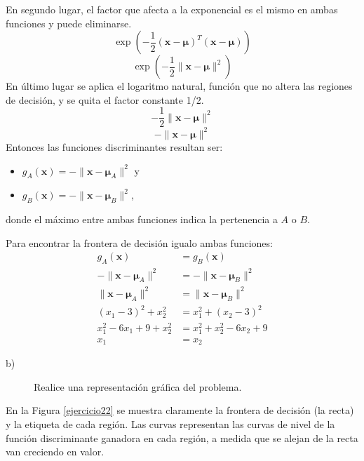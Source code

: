 \documentclass[11pt,a4paper,final]{article}
\begin{document}
En segundo lugar, el factor que afecta a la exponencial es el mismo en ambas funciones y puede eliminarse. 
\[\exp\left(-\frac{1}{2}({\mathbf x}-{\boldsymbol\mu})^T({\mathbf x}-{\boldsymbol\mu})\right)\]
\[\exp\left(-\frac{1}{2}\parallel{\mathbf x}-{\boldsymbol\mu}\parallel^2
\right)\]
En último lugar se aplica el logaritmo natural, función que no altera las regiones de decisión, y se quita el factor constante 1/2.
\[-\frac{1}{2}\parallel{\mathbf x}-{\boldsymbol\mu}\parallel^2\]
\[-\parallel{\mathbf x}-{\boldsymbol\mu}\parallel^2 \]
Entonces las funciones discriminantes resultan ser:
\begin{itemize}
\item $g_A(\mathbf{x})= -\parallel{\mathbf x}-{\boldsymbol\mu}_A\parallel^2$ y
\item $g_B(\mathbf{x})= -\parallel{\mathbf x}-{\boldsymbol\mu}_B\parallel^2$,
\end{itemize}
donde el máximo entre ambas funciones indica la pertenencia a $A$ o $B$.

Para encontrar la frontera de decisión igualo ambas funciones:
\begin{align*}
g_A(\mathbf{x}) &= g_B(\mathbf{x}) \\
-\parallel{\mathbf x}-{\boldsymbol\mu}_A\parallel^2 &= -\parallel{\mathbf x}-{\boldsymbol\mu}_B\parallel^2 \\
\parallel{\mathbf x}-{\boldsymbol\mu}_A\parallel^2 &= \parallel{\mathbf x}-{\boldsymbol\mu}_B\parallel^2 \\
(x_1 - 3)^2 + x_2^2 &= x_1^2 +(x_2 - 3)^2\\
x_1^2 - 6 x_1 + 9 + x_2^2 &= x_1^2 + x_2^2 - 6 x_2 + 9\\
x_1 &= x_2 
\end{align*}

\begin{description}
\item[b)] Realice una representación gráfica del problema.
\end{description}
En la Figura \ref{ejercicio22} se muestra claramente la frontera de decisión (la recta) y la etiqueta de cada región. Las curvas representan las curvas de nivel de la función discriminante ganadora en cada región, a medida que se alejan de la recta van creciendo en valor.  
\end{document}
